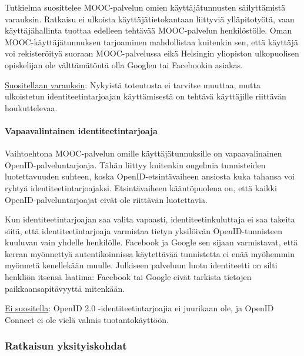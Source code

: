 \documentclass[finnish,gradu]{tktltiki}
\begin{document}
  Tutkielma suosittelee MOOC-palvelun omien käyttäjätunnusten säilyttämistä varauksin. Ratkaisu ei ulkoista käyttäjätietokantaan liittyviä ylläpitotyötä, vaan käyttäjähallinta tuottaa edelleen tehtävää MOOC-palvelun henkilöstölle. Oman MOOC-käyttäjätunnuksen tarjoaminen mahdollistaa kuitenkin sen, että käyttäjä voi rekisteröityä suoraan MOOC-palvelussa eikä Helsingin yliopiston ulkopuolisen opiskelijan ole välttämätöntä olla Googlen tai Facebookin asiakas.

  \underline{Suositellaan varauksin}: Nykyistä toteutusta ei tarvitse muuttaa, mutta ulkoistetun identiteetintarjoajan käyttämisestä on tehtävä käyttäjille riittävän houkuttelevaa.



  \paragraph{Vapaavalintainen identiteetintarjoaja} \hfill %
  \label{par:vapaavalintainen_identiteetintarjoaja}

  Vaihtoehtona MOOC-palvelun omille käyttäjätunnuksille on vapaavalinainen OpenID-palveluntarjoaja. Tähän liittyy kuitenkin ongelmia tunnisteiden luotettavuuden suhteen, koska OpenID-etsintävaiheen ansiosta kuka tahansa voi ryhtyä identiteetintarjoajaksi. Etsintävaiheen kääntöpuolena on, että kaikki OpenID-palveluntarjoajat eivät ole riittävän luotettavia.

  Kun identiteetintarjoajan saa valita vapaasti, identiteetinkuluttaja ei saa takeita siitä, että identiteetintarjoaja varmistaa tietyn yksilöivän OpenID-tunnisteen kuuluvan vain yhdelle henkilölle. Facebook ja Google sen sijaan varmistavat, että kerran myönnettyä autentikoinnissa käytettävää tunnistetta ei enää myöhemmin myönnetä kenellekään muulle. Julkiseen palveluun luotu identiteetti on silti henkliön itsensä laatima: Facebook tai Google eivät tarkista tietojen paikkaansapitävyyttä mitenkään.

  \underline{Ei suositella}: OpenID 2.0 -identiteetintarjoajia ei juurikaan ole, ja OpenID Connect ei ole vielä valmis tuotantokäyttöön.



  \subsubsection{Ratkaisun yksityiskohdat} %
  \label{ssub:toteutuksen_yksityiskohdat}
\end{document}
